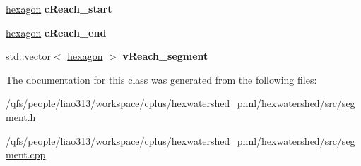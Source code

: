 \begin{DoxyCompactItemize}
\item 
\hypertarget{classhexwatershed_1_1segment_af085a918d896be0ee619429917ba00d2}{\hyperlink{classhexwatershed_1_1hexagon}{hexagon} {\bfseries c\-Reach\-\_\-start}}\label{classhexwatershed_1_1segment_af085a918d896be0ee619429917ba00d2}

\item 
\hypertarget{classhexwatershed_1_1segment_a096404720cd3c8245ea3dcf5638e6e2e}{\hyperlink{classhexwatershed_1_1hexagon}{hexagon} {\bfseries c\-Reach\-\_\-end}}\label{classhexwatershed_1_1segment_a096404720cd3c8245ea3dcf5638e6e2e}

\item 
\hypertarget{classhexwatershed_1_1segment_af1d6dedc2a40652967be4b88e3e56882}{std\-::vector$<$ \hyperlink{classhexwatershed_1_1hexagon}{hexagon} $>$ {\bfseries v\-Reach\-\_\-segment}}\label{classhexwatershed_1_1segment_af1d6dedc2a40652967be4b88e3e56882}

\end{DoxyCompactItemize}


The documentation for this class was generated from the following files\-:\begin{DoxyCompactItemize}
\item 
/qfs/people/liao313/workspace/cplus/hexwatershed\-\_\-pnnl/hexwatershed/src/\hyperlink{segment_8h}{segment.\-h}\item 
/qfs/people/liao313/workspace/cplus/hexwatershed\-\_\-pnnl/hexwatershed/src/\hyperlink{segment_8cpp}{segment.\-cpp}\end{DoxyCompactItemize}

